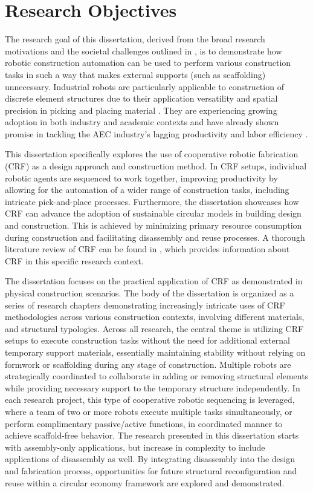 \section{Research Objectives}
    The research goal of this dissertation, derived from the broad research motivations and the societal challenges outlined in , is to demonstrate how robotic construction automation can be used to perform various construction tasks in such a way that makes external supports (such as scaffolding) unnecessary. Industrial robots are particularly applicable to construction of discrete element structures due to their application versatility \citep{bravo-palacios_one_2020} and spatial precision in picking and placing material \citep{eversmann_robotic_2017}. They are experiencing growing adoption in both industry and academic contexts \citep{ifr_world_2018} and have already shown promise in tackling the AEC industry's lagging productivity and labor efficiency \citep{garcia_de_soto_productivity_2018, kumar_robotics_2016}.

    This dissertation specifically explores the use of cooperative robotic fabrication (CRF) as a design approach and construction method. In CRF setups, individual robotic agents are sequenced to work together, improving productivity by allowing for the automation of a wider range of construction tasks, including intricate pick-and-place processes. Furthermore, the dissertation showcases how CRF can advance the adoption of sustainable circular models in building design and construction. This is achieved by minimizing primary resource consumption during construction and facilitating disassembly and reuse processes. A thorough literature review of CRF can be found in , which provides information about CRF in this specific research context.
    
    The dissertation focuses on the practical application of CRF as demonstrated in physical construction scenarios. The body of the dissertation is organized as a series of research chapters demonstrating increasingly intricate uses of CRF methodologies across various construction contexts, involving different materials, and structural typologies. Across all research, the central theme is utilizing CRF setups to execute construction tasks without the need for additional external temporary support materials, essentially maintaining stability without relying on formwork or scaffolding during any stage of construction. Multiple robots are strategically coordinated to collaborate in adding or removing structural elements while providing necessary support to the temporary structure independently. In each research project, this type of cooperative robotic sequencing is leveraged, where a team of two or more robots execute multiple tasks simultaneously, or perform complimentary passive/active functions, in coordinated manner to achieve scaffold-free behavior. The research presented in this dissertation starts with assembly-only applications, but increase in complexity to include applications of disassembly as well. By integrating disassembly into the design and fabrication process, opportunities for future structural reconfiguration and reuse within a circular economy framework are explored and demonstrated.
    

